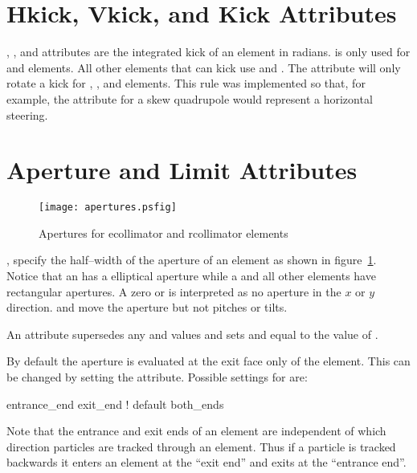 \section{Hkick, Vkick, and Kick Attributes}
\label{s:kick}

, , and  attributes are the integrated
kick of an element in radians.  is only used for 
and  elements. All other elements that can kick use 
 and . The  attribute will only rotate
a kick for , ,  and 
elements. This rule was implemented so that, for example, the 
 attribute for a skew quadrupole
would represent a horizontal steering.

\section{Aperture and Limit Attributes}
\label{s:limit}

\begin{figure}
  \centering
  \texttt{[image: apertures.psfig]}
  \caption{Apertures for ecollimator and rcollimator elements}
  \label{f:limit}
\end{figure}

,  specify the half--width of the aperture of
an element as shown in figure~\ref{f:limit}. Notice that an 
has a elliptical aperture while a  and all other elements
have rectangular apertures. A zero  or
 is interpreted as no aperture in the $x$ or $y$
direction.  and  move the aperture but not
pitches or tilts.

An  attribute supersedes
any  and  values and sets  and
 equal to the value of .

By default the aperture is evaluated at the exit face only of the
element. This can be changed by setting the  attribute.
Possible settings for  are:
\begin{example}
  entrance_end
  exit_end  ! default
  both_ends
\end{example}
Note that the entrance and exit ends of an element are independent of
which direction particles are tracked through an element. Thus if a
particle is tracked backwards it enters an element at the ``exit end''
and exits at the ``entrance end''.

